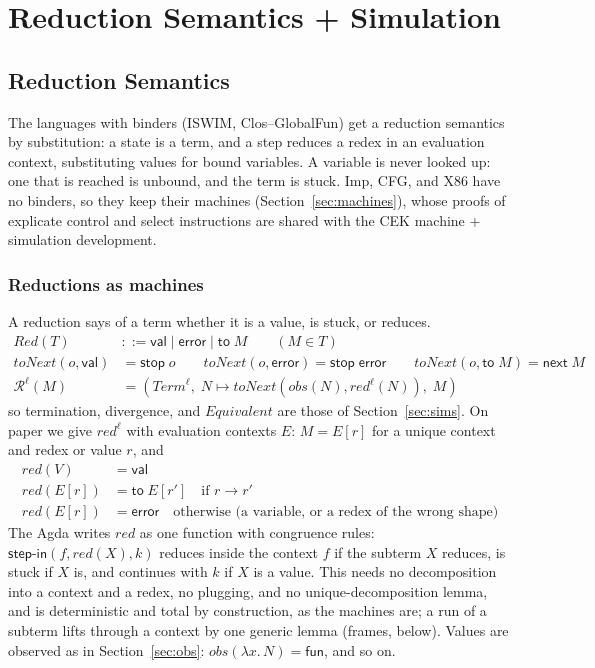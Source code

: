\documentclass[10pt]{article}
\theoremstyle{acmplain}
\newcommand{\key}[1]{\mathsf{#1}}
\newcommand{\lam}[1]{\lambda #1.\,}
\newcommand{\nxt}{\key{next}\;}
\newcommand{\stp}{\key{stop}\;}
\newcommand{\error}{\key{error}}
\newcommand{\obs}{\mathit{obs}}
\newcommand{\Equiv}{\mathit{Equivalent}}
\begin{document}
\section{Reduction Semantics + Simulation}\label{sec:u-red}

\subsection{Reduction Semantics}\label{sec:red}

The languages with binders (ISWIM, Clos--GlobalFun) get a reduction semantics
by substitution: a state is a term, and a step reduces a redex in an
evaluation context, substituting values for bound variables. A variable
is never looked up: one that is reached is unbound, and the term is stuck.
Imp, CFG, and X86 have no binders, so they keep their machines
(Section~\ref{sec:machines}), whose proofs of explicate control and select
instructions are shared with the CEK machine + simulation development.

\subsubsection{Reductions as machines}

A reduction says of a term whether it is a value, is stuck, or reduces.
\begin{align*}
  \mathit{Red}(T) &::= \key{val} \mid \error \mid \key{to}\; M \qquad (M \in T) \\
  \mathit{toNext}(o, \key{val}) &= \stp o \qquad
  \mathit{toNext}(o, \error) = \stp \error \qquad
  \mathit{toNext}(o, \key{to}\; M) = \nxt M \\
  \mathcal{R}^{\ell}(M) &= (\mathit{Term}^{\ell},\; N \mapsto \mathit{toNext}(\obs(N), \mathit{red}^{\ell}(N)),\; M)
\end{align*}
so termination, divergence, and $\Equiv$ are those of Section~\ref{sec:sims}.
On paper we give $\mathit{red}^{\ell}$ with evaluation contexts $E$: $M = E[r]$
for a unique context and redex or value $r$, and
\begin{align*}
  \mathit{red}(V) &= \key{val} \\
  \mathit{red}(E[r]) &= \key{to}\; E[r'] \quad \text{if } r \to r' \\
  \mathit{red}(E[r]) &= \error \quad \text{otherwise (a variable, or a redex of the wrong shape)}
\end{align*}
The Agda writes $\mathit{red}$ as one function with congruence rules:
$\key{step\text{-}in}(f, \mathit{red}(X), k)$ reduces inside the context $f$ if
the subterm $X$ reduces, is stuck if $X$ is, and continues with $k$ if $X$ is
a value. This needs no decomposition into a context and a redex, no plugging,
and no unique-decomposition lemma, and is deterministic and total by
construction, as the machines are; a run of a subterm lifts through a
context by one generic lemma (frames, below).
Values are observed as in Section~\ref{sec:obs}: $\obs(\lam{x} N) = \key{fun}$,
and so on.
\end{document}
